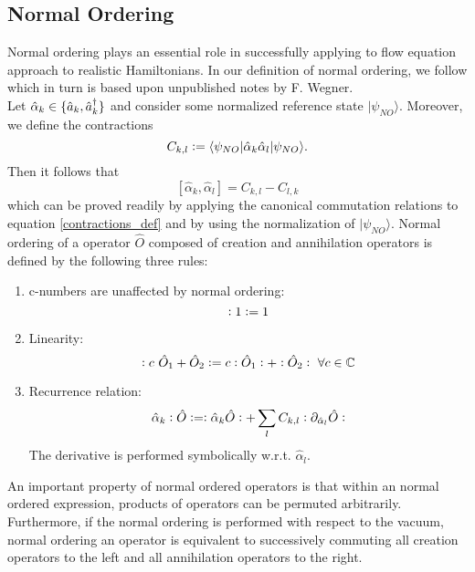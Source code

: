 \subsection{Normal Ordering}
Normal ordering plays an essential role in successfully applying to flow equation approach to realistic Hamiltonians. In our definition of normal ordering, we follow \cite[pp. 62-63]{kehrein2006flow} which in turn is based upon unpublished notes by F. Wegner.\\
Let $\hat\alpha_k\in\{\hat a_k,\hat a^\dagger_k\}$ and consider some normalized reference state $|\psi_{NO}\rangle$. Moreover, we define the contractions 
\begin{equation}\label{contractions_def}
C_{k,l}\vcentcolon= \langle \psi_{NO}|\hat\alpha_k\hat\alpha_l|\psi_{NO}\rangle.
\end{equation}
Then it follows that
\begin{equation}
\left[\hat\alpha_k,\hat\alpha_l\right] = C_{k,l}-C_{l,k}
\end{equation}
which can be proved readily by applying the canonical commutation relations to equation \ref{contractions_def} and by using the normalization of $|\psi_{NO}\rangle$.
Normal ordering of a operator $\hat O$ composed of creation and annihilation operators is defined by the following three rules:
\begin{enumerate}
\item c-numbers are unaffected by normal ordering:
\begin{equation}
\vcentcolon 1\vcentcolon = 1
\end{equation}
\item Linearity:
\begin{equation}
\vcentcolon c\ \hat O_1+\hat O_2\vcentcolon = c \vcentcolon \hat O_1\vcentcolon+\vcentcolon \hat O_2\vcentcolon\ \forall c\in\mathbb{C}
\end{equation}
\item Recurrence relation:
\begin{equation}\label{recurrence relation}
\hat\alpha_k\vcentcolon\hat O\vcentcolon=\vcentcolon\hat\alpha_k\hat O\vcentcolon + \sum\limits_l C_{k,l}\vcentcolon{\partial_{\hat\alpha_l}\hat O}\vcentcolon 
\end{equation}
The derivative is performed symbolically w.r.t. $\hat\alpha_l$.
\end{enumerate}
An important property of normal ordered operators is that within an normal ordered expression, products of operators can be permuted arbitrarily.\\
Furthermore, if the normal ordering is performed with respect to the vacuum, normal ordering an operator is equivalent to successively commuting all creation operators to the left and all annihilation operators to the right. 
